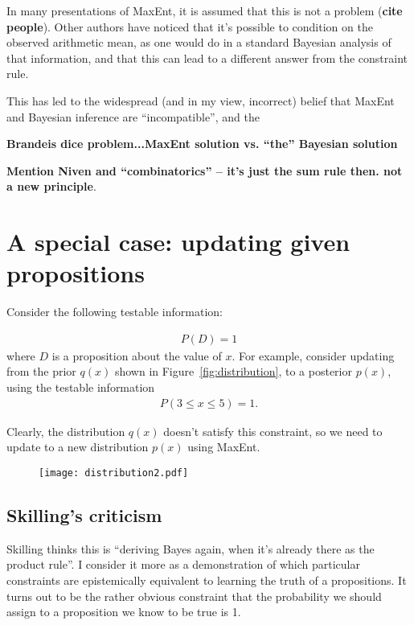 \documentclass[a4paper, 11pt]{article}
\begin{document}
In many presentations of MaxEnt, it is assumed that this is not a problem
({\bf cite people}). Other authors have noticed that it's possible to
condition on the observed arithmetic mean, as one would do in a standard
Bayesian analysis of that information, and that this can lead to a different
answer from the constraint rule.


This has led to the widespread (and in my view, incorrect) belief that
MaxEnt and Bayesian inference are ``incompatible'', and the 

{\bf Brandeis dice problem...MaxEnt solution vs. ``the'' Bayesian solution}


{\bf Mention Niven and ``combinatorics'' -- it's just the sum rule then. not
a new principle}.

\section{A special case: updating given propositions}
Consider the following testable information:

\begin{eqnarray}
P(D) = 1
\end{eqnarray}
where $D$ is a proposition about the value of $x$. For example, consider
updating from the prior $q(x)$ shown in Figure~\ref{fig:distribution}, to
a posterior $p(x)$, using the testable information
\begin{eqnarray}
P(3 \leq x \leq 5) = 1.
\end{eqnarray}

Clearly, the distribution $q(x)$ doesn't satisfy this constraint, so we
need to update to a new distribution $p(x)$ using MaxEnt.

\begin{figure}
\begin{center}
\texttt{[image: distribution2.pdf]}
\caption{\label{fig:distribution2}}
\end{center}
\end{figure}

\subsection{Skilling's criticism}
Skilling thinks this is ``deriving Bayes again, when it's already there
as the product rule''. I consider it more as a demonstration of which
particular constraints are epistemically equivalent to learning the
truth of a propositions. It turns out to be the rather obvious constraint
that the probability we should assign to a proposition we know to be true
is 1.
\end{document}
